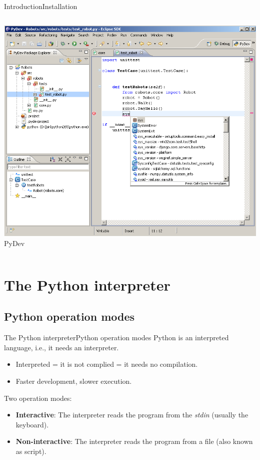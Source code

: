 \documentclass[10pt,compress]{beamer} %
\begin{document}
\begin{frame}{Introduction}{Installation}
\begin{columns}
		\includegraphics[width=\linewidth]{figs/pydev.png}\\\centering PyDev
	\end{columns}
\end{frame}


\section{The Python interpreter}

\subsection{Python operation modes}
\begin{frame}{The Python interpreter}{Python operation modes}
		Python is an interpreted language, i.e., it needs an interpreter.
			\begin{itemize}
				\item Interpreted = it is not complied = it needs no compilation.
				\item Faster development, slower execution.
			\end{itemize}
		Two operation modes:
			\begin{itemize}
				\item \textbf{Interactive}: The interpreter reads the program from the \textit{stdin} (usually the keyboard).
				\item \textbf{Non-interactive}: The interpreter reads the program from a file (also known as \alert{script}).
			\end{itemize}
\end{frame}
\end{document}
